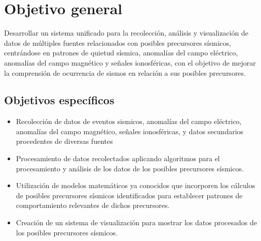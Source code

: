 \section{Objetivo general }
Desarrollar un sistema unificado para la recolección, análisis y visualización de datos de múltiples fuentes relacionados con posibles precursores sísmicos, centrándose en patrones de quietud sísmica, anomalías del campo eléctrico, anomalías del campo magnético y señales ionosféricas, con el objetivo de mejorar la comprensión de ocurrencia de sismos en relación a sus posibles precursores.

\subsection{Objetivos específicos}
\begin{itemize}
    \item Recolección de datos de eventos sismicos, anomalías del campo eléctrico, anomalías del campo magnético, señales ionosféricas, y datos secundarios procedentes de diversas fuentes 

    \item Procesamiento de datos recolectados aplicando algoritmos para el procesamiento y análisis de los datos de los posibles precursores sísmicos. 
    
    \item Utilización de modelos matemáticos ya conocidos que incorporen los cálculos de posibles precursores sísmicos identificados para establecer patrones de comportamiento relevantes de dichos precursores.
    
    \item Creación de un sistema de visualización para mostrar los datos procesados de los posibles precursores sísmicos.

\end{itemize}
\clearpage